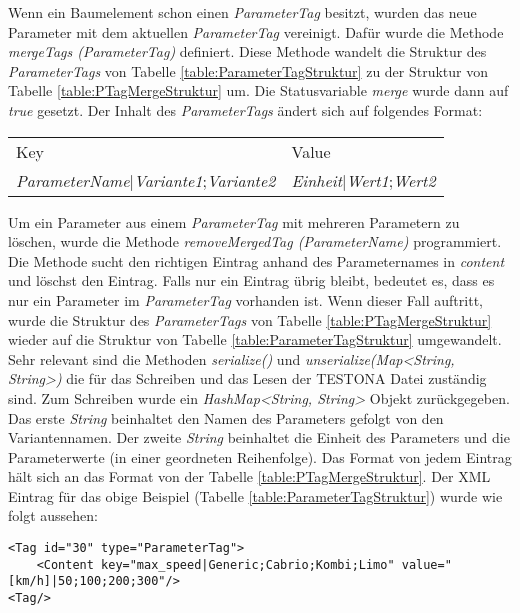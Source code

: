 Wenn ein Baumelement schon einen \textit{ParameterTag} besitzt, wurden das neue Parameter mit dem aktuellen \textit{ParameterTag} vereinigt. Dafür wurde die Methode \textit{mergeTags (ParameterTag)} definiert. Diese Methode wandelt die Struktur des \textit{ParameterTags} von Tabelle \ref{table:ParameterTagStruktur} zu der Struktur von Tabelle \ref{table:PTagMergeStruktur} um. Die Statusvariable \textit{merge} wurde dann auf \textit{true} gesetzt. Der Inhalt des \textit{ParameterTags} ändert sich auf folgendes Format:

\begin{center}
\begin{tabular}{l l}
Key									&Value\\
\textit{ParameterName}|\textit{Variante1};\textit{Variante2}		&\textit{Einheit}|\textit{Wert1};\textit{Wert2}\\
\end{tabular}
\end{center}


Um ein Parameter aus einem \textit{ParameterTag} mit mehreren Parametern zu löschen, wurde die Methode \textit{removeMergedTag (ParameterName)} programmiert. Die Methode sucht den richtigen Eintrag anhand des Parameternames in \textit{content} und löschst den Eintrag. Falls nur ein Eintrag übrig bleibt, bedeutet es, dass es nur ein Parameter im \textit{ParameterTag} vorhanden ist. Wenn dieser Fall auftritt, wurde die Struktur des \textit{ParameterTags} von Tabelle \ref{table:PTagMergeStruktur} wieder auf die Struktur von Tabelle \ref{table:ParameterTagStruktur} umgewandelt.\\


Sehr relevant sind die Methoden \textit{serialize()} und \textit{unserialize(Map<String, String>)} die für das Schreiben und das Lesen der TESTONA Datei zuständig sind. Zum Schreiben wurde ein \textit{HashMap<String, String>} Objekt zurückgegeben. Das erste \textit{String} beinhaltet den Namen des Parameters gefolgt von den Variantennamen. Der zweite \textit{String} beinhaltet die Einheit des Parameters und die Parameterwerte (in einer geordneten Reihenfolge). Das Format von jedem Eintrag hält sich an das Format von der Tabelle \ref{table:PTagMergeStruktur}. Der XML Eintrag für das obige Beispiel (Tabelle \ref{table:ParameterTagStruktur}) wurde wie folgt aussehen:\\

\begin{lstlisting}[caption={XML Darstellung eines ParameterTags}, captionpos=b]
<Tag id="30" type="ParameterTag">
	<Content key="max_speed|Generic;Cabrio;Kombi;Limo" value="[km/h]|50;100;200;300"/>
<Tag/>
\end{lstlisting}


